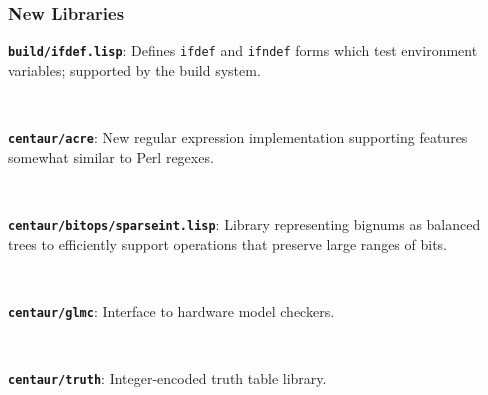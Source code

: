 \documentclass{beamer}
\newcommand{\code}[1]{\texttt{#1}}
\newcommand{\bookpath}[1]{\textbf{\code{#1}}}
\newcommand{\newlibtitle}{\frametitle{New Libraries}}
\begin{document}













\begin{frame}

\newlibtitle

\bookpath{build/ifdef.lisp}:
Defines \code{ifdef} and \code{ifndef} forms which test environment variables;
supported by the build system.

\

\bookpath{centaur/acre}:
New regular expression implementation supporting features somewhat similar to Perl regexes.

\

\bookpath{centaur/bitops/sparseint.lisp}:
Library representing bignums as balanced trees to efficiently support
operations that preserve large ranges of bits.

\

\bookpath{centaur/glmc}:
Interface to hardware model checkers.

\

\bookpath{centaur/truth}:
Integer-encoded truth table library.

\end{frame}
\end{document}
